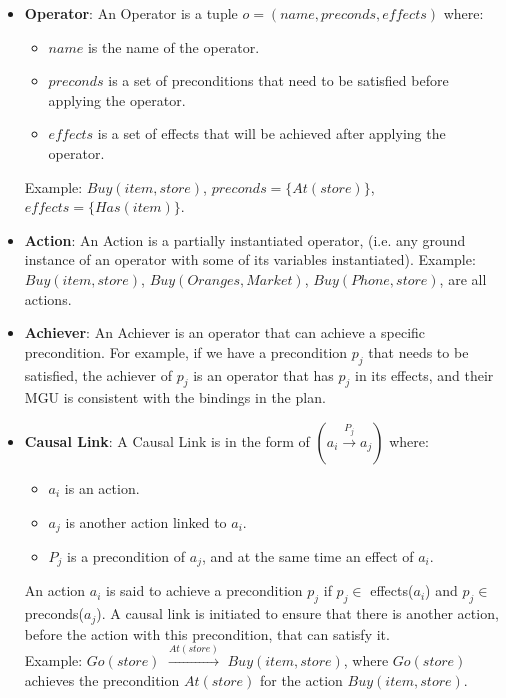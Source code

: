 \begin{itemize}
    \item \label{def:operator}
          \textbf{Operator}: An Operator is a tuple $o = (name, preconds, effects)$ where:
          \begin{itemize}
              \item $name$ is the name of the operator.
              \item $preconds$ is a set of preconditions that need to be satisfied before applying the operator.
              \item $effects$ is a set of effects that will be achieved after applying the operator.
          \end{itemize}
          Example: $Buy(item,store)$, $preconds = \{At(store)\}$, $effects = \{Has(item)\}$.

    \item \label{def:action}
          \textbf{Action}: An Action  is a partially instantiated operator,
          (i.e. any ground instance of an operator with some of its variables instantiated).
          Example: $Buy(item,store)$, $Buy(Oranges,Market)$, $Buy(Phone,store)$, are all actions.

    \item \label{def:achiever}
          \textbf{Achiever}: An Achiever is an operator that can achieve a specific precondition. For example, if we have a precondition $p_j$ that needs to be satisfied, the achiever of $p_j$ is an operator that has $p_j$ in its effects, and their \ac{MGU} is consistent with the bindings in the plan.

    \item \label{def:causal_link}
          \textbf{Causal Link}: A Causal Link is in the form of $(a_i \xrightarrow{\text{$P_j$}} a_j)$ where:
          \begin{itemize}
              \item $a_i$ is an action.
              \item $a_j$ is another action linked to $a_i$.
              \item $P_j$ is a precondition of $a_j$, and at the same time an effect of $a_i$.
          \end{itemize}
          An action $a_i$ is said to achieve a precondition $p_j$ if $p_j \in$ effects($a_i$) and $p_j \in$ preconds($a_j$).
          A causal link is initiated to ensure that there is another action, before the action with this precondition, that can satisfy it.
          \\ Example: $Go(store)$ $\xrightarrow{\text{$At(store)$}}$ $Buy(item,store)$, where $Go(store)$ achieves the precondition $At(store)$ for the action $Buy(item,store)$.


\end{itemize}
